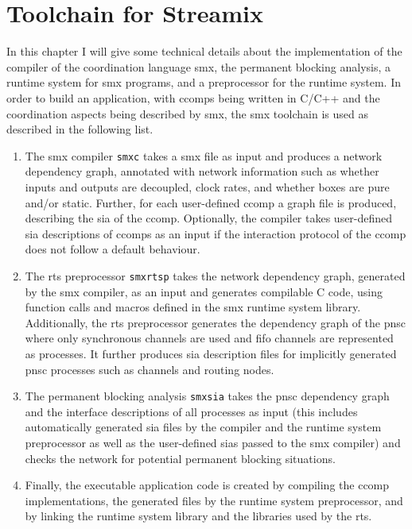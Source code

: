 %
\chapter{Toolchain for Streamix}
\label{chap_tool}

In this chapter I will give some technical details about the implementation of the compiler of the coordination language \gls*{smx}, the permanent blocking analysis, a runtime system for \gls*{smx} programs, and a preprocessor for the runtime system.
In order to build an application, with \glspl*{ccomp} being written in C/C++ and the coordination aspects being described by \gls*{smx}, the \gls*{smx} toolchain is used as described in the following list.
\begin{enumerate}
    \item The \gls*{smx} compiler \texttt{smxc} takes a \gls*{smx} file as input and produces a network dependency graph, annotated with network information such as whether inputs and outputs are decoupled, clock rates, and whether boxes are pure and/or static.
        Further, for each user-defined \gls*{ccomp} a graph file is produced, describing the \gls{sia} of the \gls*{ccomp}.
        Optionally, the compiler takes user-defined \gls{sia} descriptions of \glspl*{ccomp} as an input if the interaction protocol of the \gls*{ccomp} does not follow a default behaviour.
    \item The \gls{rts} preprocessor \texttt{smxrtsp} takes the network dependency graph, generated by the \gls*{smx} compiler, as an input and generates compilable C code, using function calls and macros defined in the \gls*{smx} runtime system library.
        Additionally, the \gls{rts} preprocessor generates the dependency graph of the \gls{pnsc} where only synchronous channels are used and \gls{fifo} channels are represented as processes.
        It further produces \gls{sia} description files for implicitly generated \gls{pnsc} processes such as channels and routing nodes.
    \item The permanent blocking analysis \texttt{smxsia} takes the \gls{pnsc} dependency graph and the interface descriptions of all processes as input (this includes automatically generated \gls{sia} files by the compiler and the runtime system preprocessor as well as the user-defined \glspl{sia} passed to the \gls*{smx} compiler) and checks the network for potential permanent blocking situations.
    \item Finally, the executable application code is created by compiling the \gls*{ccomp} implementations, the generated files by the runtime system preprocessor, and by linking the runtime system library and the libraries used by the \gls{rts}.
\end{enumerate}

